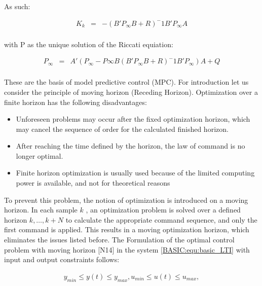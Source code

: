 		As such:
		
		\begin{equation}
        \begin{array}{rcl}
         K_k&=&-(B'P_\infty B+R)^-1B'P_\infty A\\
        \end{array}
        \label{BASIC:equ:control_coefficient_infinite}
    \end{equation}
		
		with P as the unique solution of the Riccati equiation:
		
		\begin{equation}
        \begin{array}{rcl}
				P_\infty&=&A'(P_\infty-P\infty B(B'P_\infty B+R)^-1B'P_\infty)A+Q\\
        \end{array}
        \label{BASIC:equ:Riccati_infinite}
    \end{equation}
		
		These are the basis of model predictive control (MPC). For introduction let us consider the principle of moving horizon (Receding Horizon). Optimization over a finite horizon has the following disadvantages:
		
		\begin{itemize}
			\item Unforeseen problems may occur after the fixed optimization horizon, which may cancel the sequence of order for the 		calculated finished horizon.
		\item After reaching the time defined by the horizon, the law of command is no longer optimal.
		\item Finite horizon optimization is usually used because of the limited computing power is available, and not for theoretical reasons 
		\end{itemize}
		
		To prevent this problem, the notion of optimization is introduced on a moving horizon. In each sample $k$ , an optimization problem is solved over a defined horizon $k,\dots,k+N$ to calculate the appropriate command sequence, and only the first command is applied. This results in a moving optimization horizon, which eliminates the issues listed before. The Formulation of the optimal control problem with moving horizon [N14] in the system \ref{BASIC:equ:basic_LTI} with input and output constraints follows:
		
		\begin{equation}
        \begin{array}{c}
				y_{min}\leq y(t)\leq y_{max},u_{min}\leq u(t)\leq u_{max},\\
        \end{array}
        \label{BASIC:equ:receiding_horison_constraints}
    \end{equation}
		
